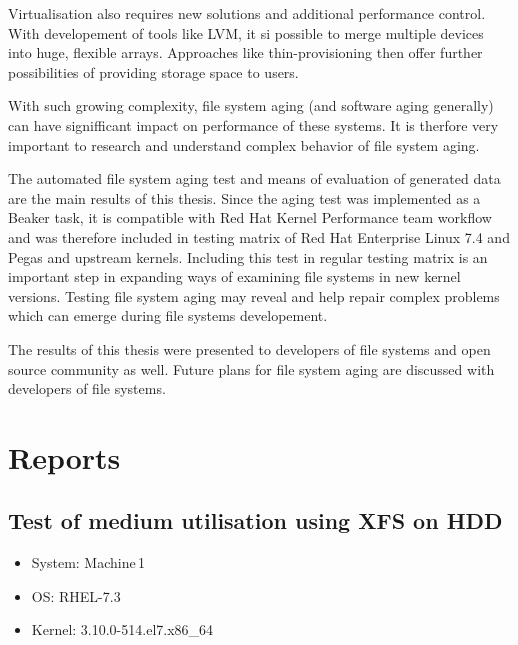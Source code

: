 \documentclass[
  color, %
  table, %
  lof,   %
  lot,   %
]{fithesis3}
\begin{document}

Virtualisation also requires new solutions and additional performance control. With developement of tools like LVM, it si possible to merge multiple devices into huge, flexible arrays. Approaches like thin-provisioning then offer further possibilities of providing storage space to users. 

With such growing complexity, file system aging (and software aging generally) can have signifficant impact on performance of these systems. It is therfore very important to research and understand complex behavior of file system aging.

The automated file system aging test and means of evaluation of generated data are the main results of this thesis. Since the aging test was implemented as a Beaker task, it is compatible with Red Hat Kernel Performance team workflow and was therefore included in testing matrix of Red Hat Enterprise Linux 7.4 and Pegas and upstream kernels. Including this test in regular testing matrix is an important step in expanding ways of examining file systems in new kernel versions. Testing file system aging may reveal and help repair complex problems which can emerge during file systems developement.

The results of this thesis were presented to developers of file systems and open source community as well. Future plans for file system aging are discussed with developers of file systems.




















\appendix %
\chapter{Reports}\label{reports}



\section{Test of medium utilisation using XFS on HDD}

\begin{itemize}
\itemsep0em 
   \item System: Machine\,1
   \item OS: RHEL-7.3
   \item Kernel: 3.10.0-514.el7.x86\_64
\end{itemize}
\end{document}
